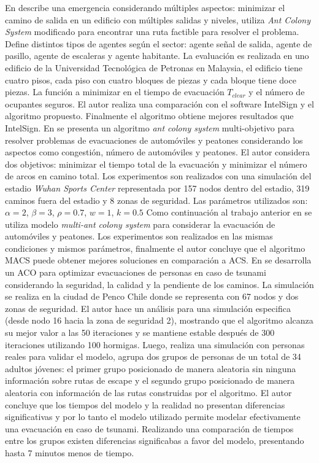 En \cite{rahman2007feasible} describe una emergencia considerando múltiples aspectos: minimizar el camino de salida en un edificio con múltiples salidas y niveles, utiliza \textit{Ant Colony System} modificado para encontrar una ruta factible para resolver el problema. Define distintos tipos de agentes según el sector: agente señal de salida, agente de pasillo, agente de escaleras y agente habitante. La evaluación es realizada en uno edificio de la Universidad Tecnológica de Petronas en Malaysia, el edificio tiene cuatro pisos, cada piso con cuatro bloques de piezas y cada bloque tiene doce piezas. La función a minimizar en el tiempo de evacuación $T_{clear}$ y el número de ocupantes seguros. El autor realiza una comparación con el software IntelSign y el algoritmo propuesto. Finalmente el algoritmo obtiene mejores resultados que IntelSign.
En \cite{zong2010multi} se presenta un algoritmo \textit{ant colony system} multi-objetivo para resolver problemas de evacuaciones de automóviles y peatones  considerando los aspectos como congestión, número de automóviles y peatones. El autor considera dos objetivos: minimizar el tiempo total de la evacuación y minimizar el número de arcos en camino total. Los experimentos son realizados con una simulación del estadio \textit{Wuhan Sports Center} representada por 157 nodos dentro del estadio, 319 caminos fuera del estadio y 8 zonas de seguridad. Las parámetros utilizados son: $\alpha=2$, $\beta=3$, $\rho=0.7$, $w=1$, $k=0.5$
Como continuación al trabajo anterior en \cite{zong2010multiflow} se utiliza modelo \textit{multi-ant colony system} para considerar la evacuación de automóviles y peatones. Los experimentos son realizados en las mismas condiciones y mismos parámetros, finalmente el autor concluye que el algoritmo MACS puede obtener mejores soluciones en comparación a ACS.
En \cite{forcael2014ant} se desarrolla un ACO para optimizar evacuaciones de personas en caso de tsunami considerando la seguridad, la calidad y la pendiente de los caminos. La simulación se realiza en la ciudad de Penco Chile donde se representa con 67 nodos y dos zonas de seguridad. El autor hace un análisis para una simulación especifica (desde nodo 16 hacia la zona de seguridad 2), mostrando que el algoritmo alcanza su mejor valor a las 50 iteraciones y se mantiene estable después de 300 iteraciones utilizando 100 hormigas. Luego, realiza una simulación con personas reales para validar el modelo, agrupa dos grupos de personas de un total de 34 adultos jóvenes: el primer grupo posicionado de manera aleatoria sin ninguna información sobre rutas de escape y el segundo grupo posicionado de manera aleatoria con información de las rutas construidas por el algoritmo. El autor concluye que los tiempos del modelo y la realidad no presentan diferencias significativas y por lo tanto el modelo utilizado permite modelar efectivamente una evacuación en caso de tsunami. Realizando una comparación de tiempos entre los grupos existen diferencias significabas a favor del modelo, presentando hasta 7 minutos menos de tiempo. \\
